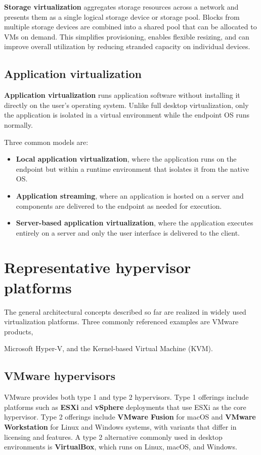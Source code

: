 \documentclass[11pt,a4paper,openany]{report}
\begin{document}
\textbf{Storage virtualization} aggregates storage resources across a network and presents them as a single logical storage device or storage pool. Blocks from multiple storage devices are combined into a shared pool that can be allocated to VMs on demand. This simplifies provisioning, enables flexible resizing, and can improve overall utilization by reducing stranded capacity on individual devices.

\subsection{Application virtualization}

\textbf{Application virtualization} runs application software without installing it directly on the user's operating system. Unlike full desktop virtualization, only the application is isolated in a virtual environment while the endpoint OS runs normally.

Three common models are:

\begin{itemize}
\item \textbf{Local application virtualization}, where the application runs on the endpoint but within a runtime environment that isolates it from the native OS.
\item \textbf{Application streaming}, where an application is hosted on a server and components are delivered to the endpoint as needed for execution.
\item \textbf{Server-based application virtualization}, where the application executes entirely on a server and only the user interface is delivered to the client.
\end{itemize}

\section{Representative hypervisor platforms}

The general architectural concepts described so far are realized in widely used virtualization platforms. Three commonly referenced examples are VMware products,

Microsoft Hyper-V, and the Kernel-based Virtual Machine (KVM).

\subsection{VMware hypervisors}

VMware provides both type 1 and type 2 hypervisors. Type 1 offerings include platforms such as \textbf{ESXi} and \textbf{vSphere} deployments that use ESXi as the core hypervisor. Type 2 offerings include \textbf{VMware Fusion} for macOS and \textbf{VMware Workstation} for Linux and Windows systems, with variants that differ in licensing and features. A type 2 alternative commonly used in desktop environments is \textbf{VirtualBox}, which runs on Linux, macOS, and Windows.
\end{document}
